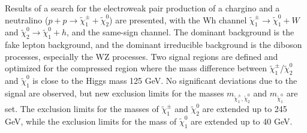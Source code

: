 Results of a search for the electroweak pair production of a chargino and a neutralino
($p + p \rightarrow \tilde{\chi}_1^\pm + \tilde{\chi}_2^0$) are presented, with the Wh channel $\tilde{\chi}_1^\pm \rightarrow \tilde{\chi}_1^0 + W$ and $\tilde{\chi}_2^0 \rightarrow \tilde{\chi}_1^0 + h$, and the same-sign channel.
The dominant background is the fake lepton background, and the dominant irreducible background is the diboson processes, especially the WZ processes.
Two signal regions are defined and optimized for the compressed region where the mass difference between $\tilde{\chi}_1^\pm$/$\tilde{\chi}_2^0$ and $\tilde{\chi}_1^0$ is close to the Higgs mass 125 GeV.
No significant deviations due to the signal are observed, but new exclusion limits for the masses $m_{\tilde{\chi}_1^\pm, \tilde{\chi}_2^0}$ and $m_{\tilde{\chi}_1^0}$ are set.
The exclusion limits for the masses of $\tilde{\chi}_1^\pm$ and $\tilde{\chi}_2^0$ are extended up to 245 GeV, while the exclusion limits for the mass of $\tilde{\chi}_1^0$ are extended up to 40 GeV.
